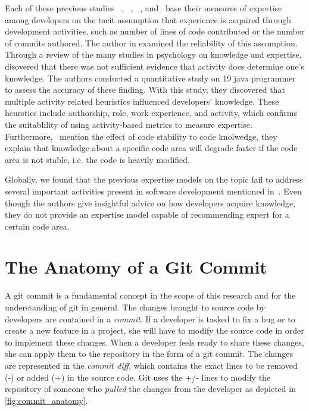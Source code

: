 Each of these previous studies ~\citep{Bhattacharya}, ~\citep{mockus02}, ~\citep{McDonald}, and~\citep{Fritz-2007} base their measures of expertise among developers on the tacit assumption that experience is acquired through development activities, such as number of lines of code contributed or the number of commits authored. The author in \citep{Fritz-2007} examined the reliability of this assumption. Through a review of the many studies in psychology on knowledge and expertise, \citep{Fritz-2007} disovered that there was not sufficient evidence that activity does determine one's knowledge. The authors conducted a quantitative study on 19 java programmer to assess the accuracy of these finding. With this study, they discovered that multiple activity related heuristics influenced developers' knowledge. These heurstics include authorship, role, work experience, and activity, which confirms the suitablility of using activity-based metrics to measure expertise. Furthermore,~\citep{Fritz-2007} mention the effect of code stability to code knolwedge, they explain that knowledge about a specific code area will degrade faster if the code area is not stable, i.e. the code is heavily modified. 

Globally, we found that the previous expertise models on the topic fail to address several important activities present in software development mentioned in~\citep{Fritz-2007}. Even though the authors give insightful advice on how developers acquire knowledge, they do not provide an expertise model capable of recommending expert for a certain code area. 

\section{The Anatomy of a Git Commit}
\label{sec:commit_anatomy}

A git commit is a fundamental concept in the scope of this research and for the understanding of git in general. The changes brought to source code by developers are contained in a \textit{commit}. If a developer is tasked to fix a bug or to create a new feature in a project, she will have to modify the source code in order to implement these changes. When a developer feels ready to share these changes, she can apply them to the repository in the form of a git commit. The changes are represented in the \textit{commit diff}, which contains the exact lines to be removed (-) or added (+) in the source code. Git uses the +/- lines to modify the repository of someone who \textit{pulled} the changes from the developer as depicted in \autoref{fig:commit_anatomy}. 

